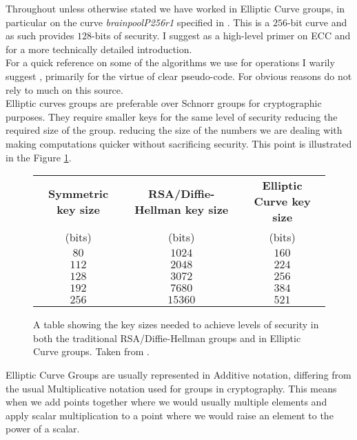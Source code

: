 \documentclass[ %
                    author={Nicholas Tutte},
                supervisor={Prof. Nigel Smart},
                    degree={MEng},
                     title={Secure Two Party Computation},
                  subtitle={A practical comparison of recent protocols},
                      type={Research - GG1K},
                      year={2015} ]{dissertation}
\begin{document}
\begin{appendices}
				Throughout unless otherwise stated we have worked in Elliptic Curve groups, in particular on the curve \emph{brainpoolP256r1} specified in \cite{BrainpoolSpecifications}. This is a $256$-bit curve and as such provides $128$-bits of security. I suggest \cite{ECC_Primer} as a high-level primer on ECC and \cite{ECC_RFC_6090} for a more technically detailed introduction.\\

				For a quick reference on some of the algorithms we use for operations I warily suggest \cite{Wiki_ECC}, primarily for the virtue of clear pseudo-code. For obvious reasons do not rely to much on this source.\\

				Elliptic curves groups are preferable over Schnorr groups for cryptographic purposes. They require smaller keys for the same level of security reducing the required size of the group. reducing the size of the numbers we are dealing with making computations quicker without sacrificing security. This point is illustrated in the Figure \ref{fig:NSA_ECC_Table}.\\

				\begin{figure}[!htb]
					\begin{tabular}{| c | c | c |}
						\hline
						\textbf{Symmetric key size} & \textbf{RSA/Diffie-Hellman key size} & \textbf{Elliptic Curve key size} \\
						(bits) & (bits) & (bits) \\
						\hline
						\hline
						$80$ & $1024$ & $160$ \\
						\hline
						$112$ & $2048$ & $224$ \\
						\hline
						$128$ & $3072$ & $256$ \\
						\hline
						$192$ & $7680$ & $384$ \\
						\hline
						$256$ & $15360$ & $521$ \\
						\hline
					\end{tabular}

					\caption{A table showing the key sizes needed to achieve levels of security in both the traditional RSA/Diffie-Hellman groups and in Elliptic Curve groups. Taken from \cite{NSA_CaseForECC}. \label{fig:NSA_ECC_Table}}
				\end{figure}

				Elliptic Curve Groups are usually represented in Additive notation, differing from the usual Multiplicative notation used for groups in cryptography. This means when we add points together where we would usually multiple elements and apply scalar multiplication to a point where we would raise an element to the power of a scalar.\\


\end{appendices}
\end{document}
